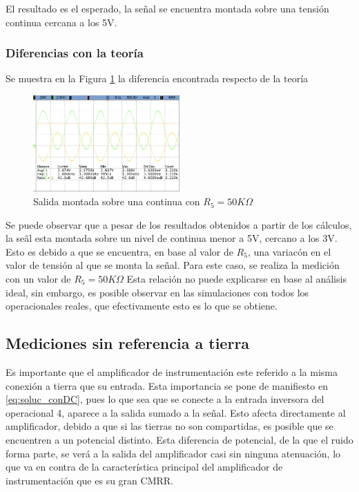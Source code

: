 El resultado es el esperado, la se\~nal se encuentra montada sobre una tensi\'on continua cercana a los 5V.

\subsubsection{Diferencias con la teor\'ia}
Se muestra en la Figura \ref{fig:VDC_MAL} la diferencia encontrada respecto de la teor\'ia

\begin{figure}[H]

    \centering
    \includegraphics[width=0.5\textwidth]{../EJ3/Recursos/DC_27}
    \caption{Salida montada sobre una continua con $R_5 = 50 K\Omega$}
    \label{fig:VDC_MAL}
\end{figure}


Se puede observar que a pesar de los resultados obtenidos a partir de los c\'alculos, la se\~al esta montada sobre un nivel de continua menor a 5V, cercano a los 3V. Esto es debido a que se encuentra, en base al valor de $R_5$, una variac\'on en el valor de tensi\'on al que se monta la se\~nal. Para este caso, se realiza la medici\'on con un valor de $R_5 = 50 K\Omega$ 
Esta relaci\'on no puede explicarse en base al an\'alisis ideal, sin embargo, es posible observar en las simulaciones con todos los operacionales reales, que efectivamente esto es lo que se obtiene.




\subsection{Mediciones sin referencia a tierra}
Es importante que el amplificador de instrumentaci\'on este referido a la misma conexi\'on a tierra que su entrada. Esta importancia se pone de manifiesto en \ref{eq:soluc_conDC}, pues lo que sea que se conecte a la entrada inversora del operacional 4, aparece a la salida sumado a la se\~nal.
Esto afecta directamente al amplificador, debido a que si las tierras no son compartidas, es posible que se encuentren a un potencial distinto. Esta diferencia de potencial, de la que el ruido forma parte, se ver\'a a la salida del amplificador casi sin ninguna atenuaci\'on, lo que va en contra de la caracter\'istica principal del amplificador de instrumentaci\'on que es su gran CMRR. 

